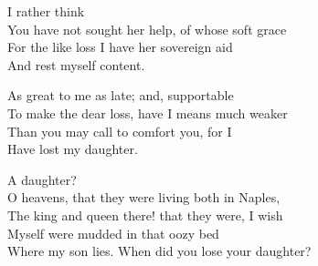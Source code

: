 \begin{verse_speech}[Prospero] 
I rather think\\
You have not sought her help, of whose soft grace\\
For the like loss I have her sovereign aid\\
And rest myself content.
\end{verse_speech}


\begin{verse_speech}[Prospero] 
As great to me as late; and, supportable\\
To make the dear loss, have I means much weaker\\
Than you may call to comfort you, for I\\
Have lost my daughter.
\end{verse_speech}

\begin{verse_speech}[Alonso] 
A daughter?\\
O heavens, that they were living both in Naples,\\
The king and queen there! that they were, I wish\\
Myself were mudded in that oozy bed\\
Where my son lies. When did you lose your daughter?
\end{verse_speech}

